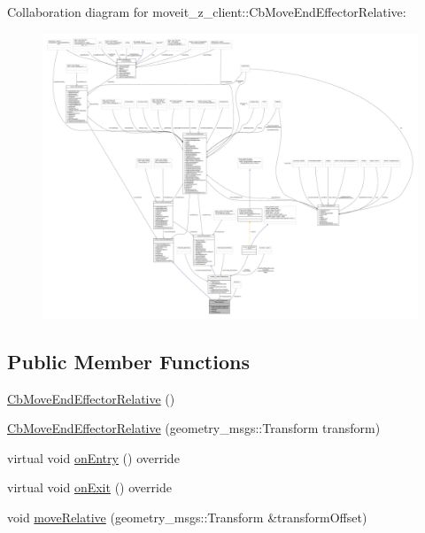 Collaboration diagram for moveit\+\_\+z\+\_\+client\+:\+:Cb\+Move\+End\+Effector\+Relative\+:
\nopagebreak
\begin{figure}[H]
\begin{center}
\leavevmode
\includegraphics[width=350pt]{classmoveit__z__client_1_1CbMoveEndEffectorRelative__coll__graph}
\end{center}
\end{figure}
\subsection*{Public Member Functions}
\begin{DoxyCompactItemize}
\item 
\hyperlink{classmoveit__z__client_1_1CbMoveEndEffectorRelative_aeabc32977cfd2e7bc34eef1cfd27d8a6}{Cb\+Move\+End\+Effector\+Relative} ()
\item 
\hyperlink{classmoveit__z__client_1_1CbMoveEndEffectorRelative_ae0add509837039979cbb3b722257fe7e}{Cb\+Move\+End\+Effector\+Relative} (geometry\+\_\+msgs\+::\+Transform transform)
\item 
virtual void \hyperlink{classmoveit__z__client_1_1CbMoveEndEffectorRelative_ae425a51d23933a13a87df9cd26f0fc99}{on\+Entry} () override
\item 
virtual void \hyperlink{classmoveit__z__client_1_1CbMoveEndEffectorRelative_af23c69f0919a2f62fbddf0e1dbdb83e1}{on\+Exit} () override
\item 
void \hyperlink{classmoveit__z__client_1_1CbMoveEndEffectorRelative_a998f25ebcd702eaa211ba7ee9209914d}{move\+Relative} (geometry\+\_\+msgs\+::\+Transform \&transform\+Offset)
\end{DoxyCompactItemize}
